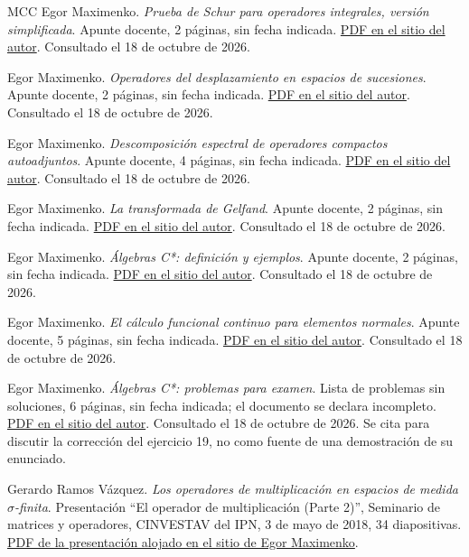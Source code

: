\begin{thebibliography}{MCC}
Egor Maximenko. \emph{Prueba de Schur para operadores integrales, versión simplificada}. Apunte docente, 2 páginas, sin fecha indicada.
\href{https://esfm.egormaximenko.com/analysis/simplified_Schur_test_for_integral_operators_es.pdf}{PDF en el sitio del autor}. Consultado el 18 de octubre de 2026.

Egor Maximenko. \emph{Operadores del desplazamiento en espacios de sucesiones}. Apunte docente, 2 páginas, sin fecha indicada.
\href{https://esfm.egormaximenko.com/analysis/shift_operators_in_lp_es.pdf}{PDF en el sitio del autor}. Consultado el 18 de octubre de 2026.

Egor Maximenko. \emph{Descomposición espectral de operadores compactos autoadjuntos}. Apunte docente, 4 páginas, sin fecha indicada.
\href{https://esfm.egormaximenko.com/analysis/spectral_decomposition_of_autoadjoint_compact_operators_es.pdf}{PDF en el sitio del autor}. Consultado el 18 de octubre de 2026.

Egor Maximenko. \emph{La transformada de Gelfand}. Apunte docente, 2 páginas, sin fecha indicada.
\href{https://esfm.egormaximenko.com/analysis/Gelfand_transform_es.pdf}{PDF en el sitio del autor}. Consultado el 18 de octubre de 2026.

Egor Maximenko. \emph{Álgebras C*: definición y ejemplos}. Apunte docente, 2 páginas, sin fecha indicada.
\href{https://esfm.egormaximenko.com/analysis/C_star_algebras_es.pdf}{PDF en el sitio del autor}. Consultado el 18 de octubre de 2026.

Egor Maximenko. \emph{El cálculo funcional continuo para elementos normales}. Apunte docente, 5 páginas, sin fecha indicada.
\href{https://esfm.egormaximenko.com/analysis/continuous_functional_calculus_for_normal_elements_es.pdf}{PDF en el sitio del autor}. Consultado el 18 de octubre de 2026.

Egor Maximenko. \emph{Álgebras C*: problemas para examen}. Lista de problemas sin soluciones, 6 páginas, sin fecha indicada; el documento se declara incompleto.
\href{https://esfm.egormaximenko.com/analysis/problems_Cstar_algebras_es.pdf}{PDF en el sitio del autor}. Consultado el 18 de octubre de 2026. Se cita para discutir la corrección del ejercicio 19, no como fuente de una demostración de su enunciado.

Gerardo Ramos Vázquez. \emph{Los operadores de multiplicación en espacios de medida $\sigma$-finita}. Presentación ``El operador de multiplicación (Parte 2)'', Seminario de matrices y operadores, CINVESTAV del IPN, 3 de mayo de 2018, 34 diapositivas.
\href{https://esfm.egormaximenko.com/students/Ramos_Vazquez_2018_presentacion_operadores_de_multiplicacion_en_L2.pdf}{PDF de la presentación alojado en el sitio de Egor Maximenko}.
\end{thebibliography}
